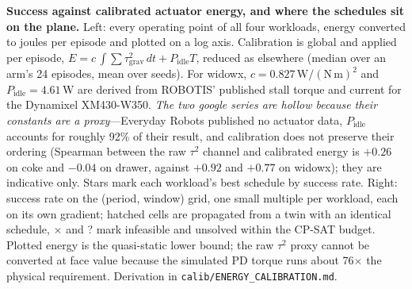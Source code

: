 
\caption{\textbf{Success against calibrated actuator energy, and where the
schedules sit on the plane.} Left: every operating point of all four workloads,
energy converted to joules per episode and plotted on a log axis. Calibration is
global and applied per episode, $E = c\,\int\!\sum\tau_{\mathrm{grav}}^2\,dt +
P_{\mathrm{idle}}T$, reduced as elsewhere (median over an arm's 24 episodes, mean
over seeds). For widowx, $c=0.827\,\mathrm{W/(N\,m)^2}$ and
$P_{\mathrm{idle}}=4.61$\,W are derived from ROBOTIS' published stall torque and
current for the Dynamixel XM430-W350. \emph{The two google series are hollow
because their constants are a proxy}---Everyday Robots published no actuator
data, $P_{\mathrm{idle}}$ accounts for roughly 92\% of their result, and
calibration does not preserve their ordering (Spearman between the raw $\tau^2$
channel and calibrated energy is $+0.26$ on coke and $-0.04$ on drawer, against
$+0.92$ and $+0.77$ on widowx); they are indicative only. Stars mark each
workload's best schedule by success rate. Right: success rate on the
(period, window) grid, one small multiple per workload, each on its own
gradient; hatched cells are propagated from a twin with an identical schedule,
$\times$ and ? mark infeasible and unsolved within the CP-SAT budget. Plotted
energy is the quasi-static lower bound; the raw $\tau^2$ proxy cannot be
converted at face value because the simulated PD torque runs about 76$\times$ the
physical requirement. Derivation in \texttt{calib/ENERGY\_CALIBRATION.md}.}
